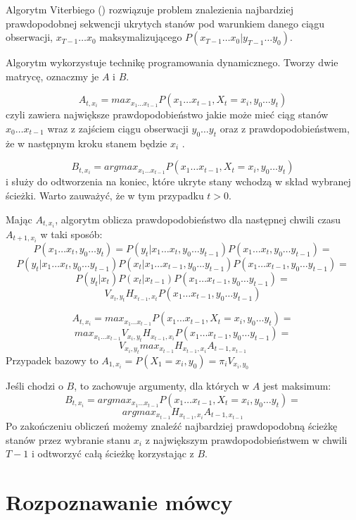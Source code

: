Algorytm Viterbiego () rozwiązuje problem znalezienia najbardziej prawdopodobnej sekwencji ukrytych stanów pod warunkiem danego ciągu obserwacji, $x_{T-1} \dots x_0$ maksymalizującego $P(x_{T-1} \dots x_0 | y_{T-1} \dots y_0)$.

Algorytm wykorzystuje technikę programowania dynamicznego. Tworzy dwie matrycę, oznaczmy je $A$ i $B$.

$$A_{t,x_i} = max_{x_1 \dots x_{t-1}} P(x_1 \dots x_{t-1}, X_t = x_i, y_0 \dots y_t)$$
czyli zawiera największe prawdopodobieństwo jakie może mieć ciąg stanów $x_0 \dots x_{t-1}$ wraz z zajściem ciągu obserwacji $y_0 \dots y_t$ oraz z prawdopodobieństwem, że w następnym kroku stanem będzie $x_i$ .

$$B_{t,x_i} = argmax_{x_1 \dots x_{t-1}} P(x_1 \dots x_{t-1}, X_t = x_i, y_0 \dots y_t)$$ i służy do odtworzenia na koniec, które ukryte stany wchodzą w skład wybranej ścieżki. Warto zauważyć, że w tym przypadku $t > 0$.

Mając $A_{t,x_i}$, algorytm oblicza prawdopodobieństwo dla następnej chwili czasu $A_{t+1,x_i}$ w taki sposób:
$$P(x_1 \dots x_t, y_0 \dots y_t) = P(y_t | x_1 \dots x_t, y_0 \dots y_{t-1}) P(x_1 \dots x_t, y_0 \dots y_{t-1}) =$$
$$P(y_t | x_1 \dots x_t, y_0 \dots y_{t-1}) P(x_t | x_1 \dots x_{t-1}, y_0 \dots y_{t-1}) P(x_1 \dots x_{t-1}, y_0 \dots y_{t-1}) =$$
$$P(y_t | x_t) P(x_t | x_{t-1}) P(x_1 \dots x_{t-1}, y_0 \dots y_{t-1}) =$$
$$V_{x_t, y_t} H_{x_{t-1}, x_t} P(x_1 \dots x_{t-1}, y_0 \dots y_{t-1})$$

$$A_{t,x_i} = max_{x_1 \dots x_{t-1}} P(x_1 \dots x_{t-1}, X_t = x_i, y_0 \dots y_t) =$$
$$max_{x_1 \dots x_{t-1}} V_{x_i, y_t} H_{x_{t-1}, x_i} P(x_1 \dots x_{t-1}, y_0 \dots y_{t-1}) =$$
$$V_{x_i, y_t} max_{x_{t-1}}H_{x_{t-1}, x_i} A_{t-1, x_{t-1}}$$
Przypadek bazowy to $A_{1,x_i} = P(X_1 = x_i, y_0) = \pi_i V_{x_i, y_0}$

Jeśli chodzi o $B$, to zachowuje argumenty, dla których w $A$ jest maksimum:
$$B_{t, x_i} = argmax_{x_1 \dots x_{t-1}} P(x_1 \dots x_{t-1}, X_t = x_i, y_0 \dots y_t) =$$
$$argmax_{x_{t-1}} H_{x_{t-1}, x_i} A_{t-1, x_{t-1}}$$
Po zakończeniu obliczeń możemy znaleźć najbardziej prawdopodobną ścieżkę stanów przez wybranie stanu $x_i$ z największym prawdopodobieństwem w chwili $T-1$ i odtworzyć całą ścieżkę korzystając z $B$\cite{aTutorialOnHidden}.

\section{Rozpoznawanie mówcy}\label{sec:rozpoznawanie_mowcy}

